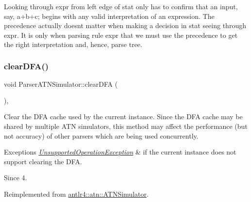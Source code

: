 Looking through expr from left edge of stat only has to confirm that an input, say, a+b+c; begins with any valid interpretation of an expression. The precedence actually doesn\textquotesingle{}t matter when making a decision in stat seeing through expr. It is only when parsing rule expr that we must use the precedence to get the right interpretation and, hence, parse tree. \mbox{\label{classantlr4_1_1atn_1_1ParserATNSimulator_a846da7dc607b212d443cb401f5830bae}} 
\subsubsection{\texorpdfstring{clear\+D\+F\+A()}{clearDFA()}}
{\footnotesize\ttfamily void Parser\+A\+T\+N\+Simulator\+::clear\+D\+FA (\begin{DoxyParamCaption}{ }\end{DoxyParamCaption})\hspace{0.3cm}{\ttfamily [override]}, {\ttfamily [virtual]}}

Clear the D\+FA cache used by the current instance. Since the D\+FA cache may be shared by multiple A\+TN simulators, this method may affect the performance (but not accuracy) of other parsers which are being used concurrently.


\begin{DoxyExceptions}{Exceptions}
{\em \hyperlink{classantlr4_1_1UnsupportedOperationException}{Unsupported\+Operation\+Exception}} & if the current instance does not support clearing the D\+FA.\\
\hline
\end{DoxyExceptions}
\begin{DoxySince}{Since}
4. 
\end{DoxySince}


Reimplemented from \hyperlink{classantlr4_1_1atn_1_1ATNSimulator_a3358fa3e8ebcb4abeeceb914b0b07f10}{antlr4\+::atn\+::\+A\+T\+N\+Simulator}.

\mbox{\label{classantlr4_1_1atn_1_1ParserATNSimulator_a17be01f2a7db2f2c18c973cc2799a5a0}} 
